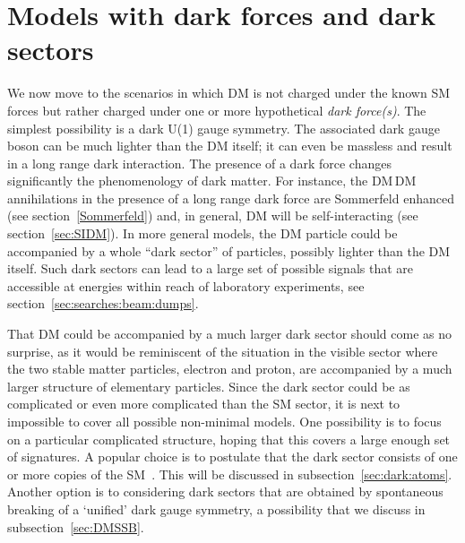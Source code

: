 \section{Models with dark forces and dark sectors}\label{sec:darksectors}
We now move to the scenarios in which DM is not charged under the known SM forces but rather charged under one or more hypothetical {\em dark force(s)}. 
The simplest possibility is a dark U(1) gauge symmetry. The associated dark gauge boson can be much lighter than the DM itself; it can even be massless and result in a long range dark interaction. 
The presence of a dark force changes significantly the phenomenology of dark matter. For instance, the DM\,DM annihilations in the presence of a long range dark force are Sommerfeld enhanced (see section~\ref{Sommerfeld}) and, in general, DM will be self-interacting (see section~\ref{sec:SIDM}).
In more general models, the DM particle could be accompanied by a whole ``dark sector'' of particles, possibly lighter than the DM itself. Such dark sectors can lead to a large set of possible signals that are accessible at energies within reach of laboratory experiments, see section~\ref{sec:searches:beam:dumps}.

That DM could be accompanied by a much larger dark sector should come as no surprise, as it would be reminiscent of the situation in the visible sector where the two stable matter particles, electron and proton, are accompanied by a much larger structure of elementary particles. Since the dark sector could be as complicated or even more complicated than the SM sector, it is next to impossible to cover all possible non-minimal models. One possibility is to focus on a particular complicated structure, hoping that this covers a large enough set of signatures. A popular choice is to postulate that the dark sector consists of one or more copies of the SM~\cite{MirrorSM}. This will be discussed in subsection~\ref{sec:dark:atoms}.
Another option is to considering dark sectors that are obtained by spontaneous breaking of a `unified' dark gauge symmetry, a possibility that we discuss in subsection~\ref{sec:DMSSB}.

\medskip

